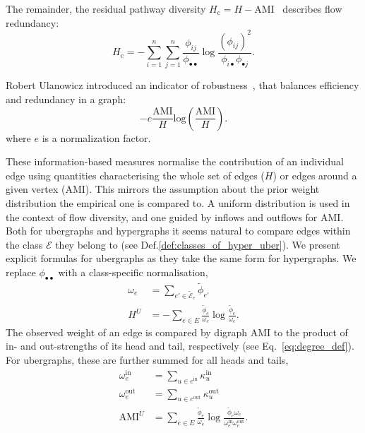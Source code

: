 \documentclass[a4paper,12pt]{article}
\theoremstyle{definition}
\theoremstyle{remark}
\newcommand{\tE}{\tilde{\mathcal{E}}}
\newcommand{\tphi}{\tilde{\phi}}
\newcommand{\tin}{\mathrm{in}} %
\newcommand{\out}{\mathrm{out}}
\begin{document}
The remainder, the residual pathway diversity $H_{\mathrm{c}}=H-\text{AMI}$~\cite{Rutledge_1976} describes flow redundancy:
\begin{equation}
			H_{\text{c}}=-\sum^{n}_{i=1}\sum^{n}_{j=1}\frac{\phi_{ij}}{\phi_{\bullet \bullet}}\log\frac{{\left(\phi_{ij}\right)}^2}{\phi_{i\bullet}\phi_{\bullet j}}.
\end{equation}

Robert Ulanowicz introduced an indicator of robustness~\cite{Ulanowicz_1997, Ulanowicz_2009},  that balances efficiency and redundancy in a graph:
\begin{equation}
	-e\frac{\mathrm{AMI}}{H}\mathrm{log}\left(\frac{\mathrm{AMI}}{H}\right).
\end{equation}
where $e$ is a normalization factor.



These information-based measures normalise the contribution of an individual edge using quantities characterising the whole set of edges ($H$) or edges around a given vertex ($\mathrm{AMI}$). This mirrors the assumption about the prior weight distribution the empirical one is compared to. A uniform distribution is used in the context of flow diversity, and one guided by inflows and outflows for AMI.
Both for ubergraphs and hypergraphs it seems natural to compare edges within the class $\mathcal{E}$ they belong to (see Def.\ref{def:classes_of_hyper_uber}). We present explicit formulas for ubergraphs as they take the same form for hypergraphs. We replace $\phi_{\bullet \bullet}$ with a class-specific normalisation, 
\begin{align}
    \omega_e&=\sum_{e' \in \tE_e} \tphi_{e'} \\
    H^U&=-\sum_{e \in E } \frac{\tphi_{e}}{\omega_e}\log\frac{\tphi_{e}}{\omega_e}.
\end{align}
The observed weight of an edge is compared by digraph AMI to the product of in- and out-strengths of its head and tail, respectively (see Eq.~\ref{eq:degree_def}). For ubergraphs, these are further summed for all heads and tails,
\begin{align}
    \omega_e^{\text{in}}&=\sum_{u \in e^{\mathrm{in}}} \kappa_{u}^{\tin} \\
    \omega_e^{\text{out}}&=\sum_{u \in e^{\mathrm{out}}} \kappa_{u}^{\out} \\
    \text{AMI}^U&=\sum_{e \in E}
    \frac{\tphi_e}{\omega_e} \log\frac{\tphi_e\omega_e}{\omega_e^{\text{in}} \omega_e^{\text{out}}}.
\end{align}
\end{document}
